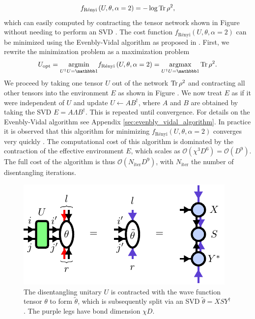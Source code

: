\begin{equation}
	\label{eq:renyi_entropy_alpha_2}
	f_\text{Rényi}\left(U,\theta,\alpha=2\right) = -\log\operatorname{Tr}\rho^2,
\end{equation}
which can easily computed by contracting the tensor network shown in Figure  without needing to perform an SVD \cite{cite:finding_purifications_with_minimal_entanglement}. The cost function $f_\text{Rényi}\left(U,\theta,\alpha=2\right)$ can be minimized using the Evenbly-Vidal algorithm as proposed in \cite{cite:finding_purifications_with_minimal_entanglement}. First, we rewrite the minimization problem as a maximization problem
\begin{equation}
	U_\text{opt} = \underset{U^\dagger U = \id}{\argmin} f_\text{Rényi}\left(U,\theta,\alpha=2\right) = \underset{U^\dagger U = \id}{\argmax}\Tr\rho^2.
\end{equation}
We proceed by taking one tensor $U$ out of the network $\operatorname{Tr}\rho^2$ and contracting all other tensors into the environment $E$ as shown in Figure . We now treat $E$ as if it were independent of $U$ and update $U\leftarrow AB^\dagger$, where $A$ and $B$ are obtained by taking the SVD $E=A\Lambda B^\dagger$. This is repeated until convergence. For details on the Evenbly-Vidal algorithm see Appendix \ref{sec:evenbly_vidal_algorithm}. In practice it is observed that this algorithm for minimizing $f_\text{Rényi}\left(U,\theta,\alpha=2\right)$ converges very quickly \cite{cite:efficient_simulation_of_dynamics_in_two_dimensional_quantum_spin_systems}. The computational cost of this algorithm is dominated by the contraction of the effective environment $E$, which scales as $\mathcal{O}(\chi^3D^6) = \mathcal{O}(D^9)$. The full cost of the algorithm is thus $\mathcal{O}(N_\text{iter}D^9)$, with $N_\text{iter}$ the number of disentangling iterations.\par
\begin{figure}
	\centering
	\includegraphics[scale=1]{figures/tikz/YB_isoTPS/theta_tilde_contraction/theta_tilde_contraction.pdf}
	\caption{The disentangling unitary $U$ is contracted with the wave function tensor $\theta$ to form $\tilde{\theta}$, which is subsequently split via an SVD $\tilde{\theta} = XSY^\dagger$. The purple legs have bond dimension $\chi D$.}
	\label{fig:disentangling_theta_definition}
\end{figure}
